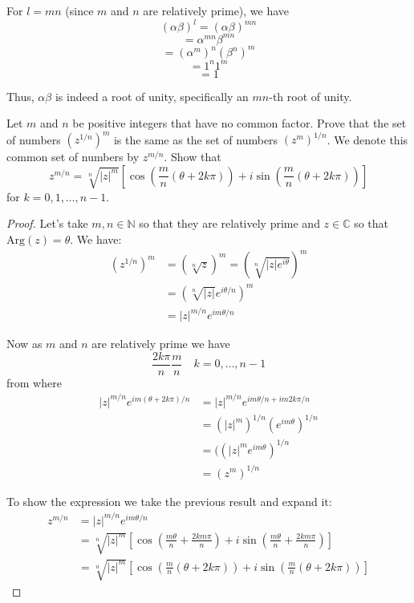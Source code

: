 For \( l = mn \) (since \( m \) and \( n \) are relatively prime), we have
\[ (\alpha\beta)^l = (\alpha\beta)^{mn} \]
\[ = \alpha^{mn}\beta^{mn} \]
\[ = (\alpha^m)^n(\beta^n)^m \]
\[ = 1^n1^m \]
\[ = 1 \]

Thus, \( \alpha\beta \) is indeed a root of unity, specifically an \( mn \)-th root of unity.

\begin{exercise}
    Let \( m \) and \( n \) be positive integers that have no common factor. Prove that the set of numbers \( (z^{1/n})^m \) is the same as the set of numbers \( (z^m)^{1/n} \). We denote this common set of numbers by \( z^{m/n} \). Show that
\[ z^{m/n} = \sqrt[n]{|z|^m} \left[ \cos \left( \frac{m}{n} (\theta + 2k\pi) \right) + i \sin \left( \frac{m}{n} (\theta + 2k\pi) \right) \right] \]
for \( k = 0, 1, \ldots, n - 1 \).
\end{exercise}
\begin{proof}
    Let's take \( m, n \in \mathbb{N} \) so that they are relatively prime and \( z \in \mathbb{C} \) so that \( \text{Arg}(z) = \theta \). We have:
\begin{align*}
(z^{1/n})^m &= (\sqrt[n]{z})^m = \left( \sqrt[n]{|z|e^{i\theta}} \right)^m \\
&= \left( \sqrt[n]{|z|}e^{i\theta/n} \right)^m \\
&= |z|^{m/n} e^{im\theta/n}
\end{align*}

Now as \( m \) and \( n \) are relatively prime we have
\[ \frac{2k\pi}{n} \frac{m}{n} \quad k = 0, \ldots, n - 1 \]
from where
\begin{align*}
|z|^{m/n} e^{im(\theta + 2k\pi)/n} &= |z|^{m/n} e^{im\theta/n + im2k\pi/n} \\
&= (|z|^m)^{1/n} (e^{im\theta})^{1/n} \\
&= ((|z|^m e^{im\theta})^{1/n} \\
&= (z^m)^{1/n}
\end{align*}

To show the expression we take the previous result and expand it:
\begin{align*}
z^{m/n} &= |z|^{m/n} e^{im\theta/n} \\
&= \sqrt[n]{|z|^m} \left[ \cos \left( \frac{m\theta}{n} + \frac{2km\pi}{n} \right) + i \sin \left( \frac{m\theta}{n} + \frac{2km\pi}{n} \right) \right] \\
&= \sqrt[n]{|z|^m} \left[ \cos \left( \frac{m}{n} (\theta + 2k\pi) \right) + i \sin \left( \frac{m}{n} (\theta + 2k\pi) \right) \right]
\end{align*}
\end{proof}


